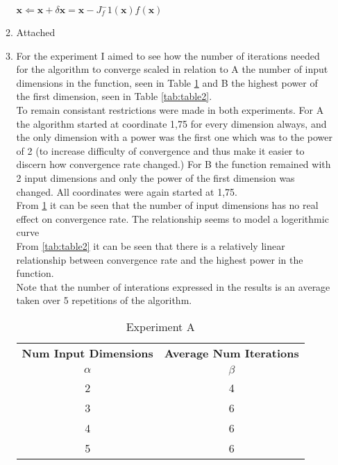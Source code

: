 \documentclass{article}
\begin{document}
\begin{enumerate}
\begin{enumerate}[label=\arabic*)]
					$\textbf{x} \Leftarrow \textbf{x} + \delta \textbf{x} = \textbf{x} - 					J_f^-1(\textbf{x})f(\textbf{x}) $
				\item
					Attached
				\item
					For the experiment I aimed to see how the number of iterations needed for the algorithm to converge scaled in relation to A the number of input dimensions in the function, seen in Table \ref{tab:table1} and B the highest power of the first dimension, seen in Table \ref{tab:table2}. \\ 
					To remain consistant restrictions were made in both experiments. For A the algorithm started at coordinate 1,75 for every dimension always, and the only dimension with a power was the first one which was to the power of 2 (to increase difficulty of convergence and thus make it easier to discern how convergence rate changed.) For B the function remained with 2 input dimensions and only the power of the first dimension was changed. All coordinates were again started at 1,75.\\
					From \ref{tab:table1} it can be seen that the number of input dimensions has no real effect on convergence rate. The relationship seems to model a logerithmic curve \\
					From \ref{tab:table2} it can be seen that there is a relatively linear relationship between convergence rate and the highest power in the function. \\
					Note that the number of interations expressed in the results is an average taken over 5 repetitions of the algorithm.
					\begin{table}[h!]
 						\begin{center}
    						\caption{Experiment A}
    						\label{tab:table1}
    						\begin{tabular}{c|c}
      						\textbf{Num Input Dimensions} & \textbf{Average Num Iterations} \\
      						$\alpha$ & $\beta$\\
      						\hline
      						2 & 4\\
      						3 & 6\\
      						4 & 6 \\
      						5 & 6 \\
    						\end{tabular}
  						\end{center}
					\end{table} 
					\\
					\begin{table}[h!]

\end{table}
\end{enumerate}
\end{enumerate}
\end{document}

